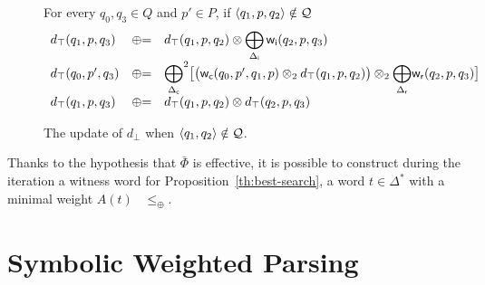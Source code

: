 \begin{figure}[ht]
For every $q_0, q_3 \in Q$ and $p' \in P$, if $\< q_1, p, q_2> \notin \Q$
\[
\begin{array}{lcl}
d_\top(q_1, p, q_3) & \opluseq &
  d_\top(q_1, p, q_2) \otimes
  \displaystyle\bigoplus_{\Deltai} \weii(q_2, p, q_3)\\
d_\top(q_0, p', q_3) & \opluseq &
  {\displaystyle\bigoplus_{\Deltac}}^2
  \bigl[ \bigl( \weic(q_0, p', q_1, p) \otimes_2
  d_\top(q_1, p, q_2) \bigr) \otimes_2
  {\displaystyle\bigoplus_{\Deltar}} \weir(q_2, p, q_3) \bigr]\\
%
d_\top(q_1, p, q_3) & \opluseq &
  d_\top(q_1, p, q_2) \otimes d_\top(q_2, p, q_3)\ 
\\
\end{array}
\]
%
\caption{The update of $d_\bot$ when $\< q_1, q_2> \notin \Q$.}
\label{fig:best-update-top}
\end{figure}
%
Thanks to the hypothesis that $\bar\Phi$ is effective, 
it is possible to construct during the iteration a witness word
for Proposition~\ref{th:best-search}, 
\ie a word $t \in \Delta^*$ with a minimal weight $A(t)$ \wrt~$\leq_\oplus$.





\section{Symbolic Weighted Parsing}
\label{sec:parsing}

